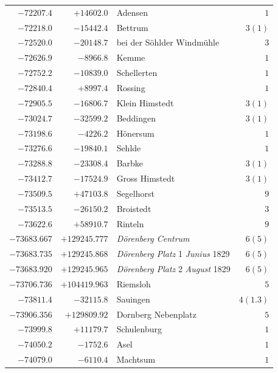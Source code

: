\begin{center}
\begin{tabular}{r|r|p{170pt}|r}
\(-72207.4\)&\(+14602.0\)&Adensen&\(1\)\\
\(-72218.0\)&\(-15442.4\)&Bettrum&\(3 (1)\)\\
\(-72520.0\)&\(-20148.7\)&bei der Söhlder Windmühle&\(3\)\\
\(-72626.9\)&\(-8966.8\)&Kemme&\(1\)\\
\(-72752.2\)&\(-10839.0\)&Schellerten&\(1\)\\
\(-72840.4\)&\(+8997.4\)&Rossing&\(1\)\\
\(-72905.5\)&\(-16806.7\)&Klein Himstedt&\(3 (1)\)\\
\(-73024.7\)&\(-32599.2\)&Beddingen&\(3 (1)\)\\
\(-73198.6\)&\(-4226.2\)&Hönersum&\(1\)\\
\(-73276.6\)&\(-19840.1\)&Sehlde&\(1\)\\
\(-73288.8\)&\(-23308.4\)&Barbke&\(3 (1)\)\\
\(-73412.7\)&\(-17524.9\)&Gross Himstedt&\(3 (1)\)\\
\(-73509.5\)&\(+47103.8\)&Segelhorst&\(9\)\\
\(-73513.5\)&\(-26150.2\)&Broistedt&\(3\)\\
\(-73622.6\)&\(+58910.7\)&Rinteln&\(9\)\\
\(-73683.667\)&\(+129245.777\)&\textit{Dörenberg Centrum}&\(6 (5)\)\\
\(-73683.735\)&\(+129245.868\)&\textit{Dörenberg Platz} 1 \textit{Junius} 1829&\(6 (5)\)\\
\(-73683.920\)&\(+129245.965\)&\textit{Dörenberg Platz} 2 \textit{August} 1829&\(6 (5)\)\\
\(-73706.736\)&\(+104419.963\)&Riemsloh&\(5\)\\
\(-73811.4\)&\(-32115.8\)&Sauingen&\(4(1.3)\)\\
\(-73906.356\)&\(+129809.92\)&Dornberg Nebenplatz&\(5\)\\
\(-73999.8\)&\(+11179.7\)&Schulenburg&\(1\)\\
\(-74050.2\)&\(-1752.6\)&Asel&\(1\)\\
\(-74079.0\)&\(-6110.4\)&Machtsum&\(1\)\\
\hline\end{tabular}\endgroup\end{center}
